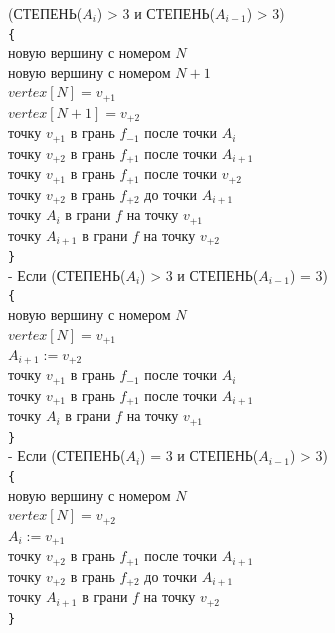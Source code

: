 \documentclass[a4paper,12pt, titlepage]{article}
\begin{document}
\begin{flushleft}
\quad\quad{} (СТЕПЕНЬ($A_{i}$) > 3 и СТЕПЕНЬ($A_{i - 1}$) > 3)\\
\quad\quad\quad\verb"{"\\
\quad\quad\quad{} новую вершину с номером $N$\\
\quad\quad\quad{} новую вершину с номером $N + 1$\\
\quad\quad\quad\quad$vertex[N] = v_{+1}$\\
\quad\quad\quad\quad$vertex[N + 1] = v_{+2}$\\
\quad\quad\quad{} точку $v_{+1}$ в грань $f_{-1}$ после точки $A_{i}$\\
\quad\quad\quad{} точку $v_{+2}$ в грань $f_{+1}$ после точки $A_{i + 1}$\\
\quad\quad\quad{} точку $v_{+1}$ в грань $f_{+1}$ после точки $v_{+2}$\\
\quad\quad\quad{} точку $v_{+2}$ в грань $f_{+2}$ до точки $A_{i + 1}$\\
\quad\quad\quad{} точку $A_{i}$ в грани $f$ на точку $v_{+1}$ \\
\quad\quad\quad{} точку $A_{i + 1}$ в грани $f$ на точку $v_{+2}$\\
\quad\quad\quad\verb"}"\\

\quad\quad{} - Если (СТЕПЕНЬ($A_{i}$) > 3 и СТЕПЕНЬ($A_{i - 1}$) = 3)\\
\quad\quad\quad\verb"{"\\
\quad\quad\quad{} новую вершину с номером $N$\\
\quad\quad\quad\quad$vertex[N] = v_{+1}$\\
\quad\quad\quad\quad$A_{i + 1} := v_{+2}$\\
\quad\quad\quad{} точку $v_{+1}$ в грань $f_{-1}$ после точки $A_{i}$\\
\quad\quad\quad{} точку $v_{+1}$ в грань $f_{+1}$ после точки $A_{i + 1}$\\
\quad\quad\quad{} точку $A_{i}$ в грани $f$ на точку $v_{+1}$\\
\quad\quad\quad\verb"}"\\

\quad\quad{} - Если (СТЕПЕНЬ($A_{i}$) = 3 и СТЕПЕНЬ($A_{i - 1}$) > 3)\\
\quad\quad\quad\verb"{"\\
\quad\quad\quad{} новую вершину с номером $N$\\
\quad\quad\quad\quad$vertex[N] = v_{+2}$\\
\quad\quad\quad\quad$A_{i} := v_{+1}$\\
\quad\quad\quad{} точку $v_{+2}$ в грань $f_{+1}$ после точки $A_{i + 1}$\\
\quad\quad\quad{} точку $v_{+2}$ в грань $f_{+2}$ до точки $A_{i + 1}$\\
\quad\quad\quad{} точку $A_{i + 1}$ в грани $f$ на точку $v_{+2}$\\
\quad\quad\quad\verb"}"\\


\end{flushleft}
\end{document}
